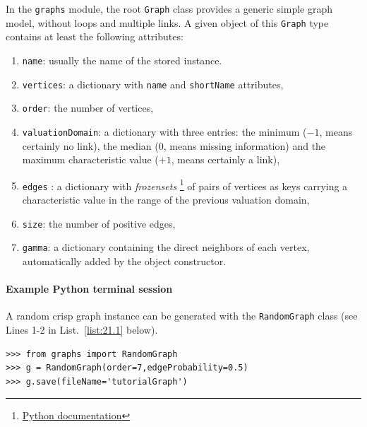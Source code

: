 In the \Digraph \texttt{graphs} module, the root \texttt{Graph} class  provides a generic simple graph model, without loops and multiple links. A given object of this \texttt{Graph} type contains at least the following attributes:
\begin{enumerate}[topsep=1pt]
\item \texttt{name}: usually the name of the stored instance.
\item \texttt{vertices}: a dictionary with \texttt{name} and \texttt{shortName} attributes,
\item \texttt{order}: the number of vertices,
\item \texttt{valuationDomain}: a dictionary with three entries: the minimum ($-1$, means certainly no link), the median ($0$, means missing information) and the maximum characteristic value ($+1$, means certainly a link),
\item \texttt{edges} : a dictionary with \emph{frozensets} \footnote{\href{https://docs.python.org/3.9/library/stdtypes.html?highlight=frozenset\#frozenset}{Python documentation}} of pairs of vertices as keys carrying a characteristic value in the range of the previous valuation domain,
\item \texttt{size}: the number of positive edges,
\item \texttt{gamma}: a dictionary containing the direct neighbors of each vertex, automatically added by the object constructor.
\end{enumerate}

\paragraph{\textbf{Example Python terminal session}}

\noindent A random crisp graph instance can be generated with the \texttt{RandomGraph} class (see Lines 1-2 in List.~\vref{list:21.1} below). 
\begin{lstlisting}[caption={Generating a randm graph instance},label=list:21.1]
>>> from graphs import RandomGraph
>>> g = RandomGraph(order=7,edgeProbability=0.5)
>>> g.save(fileName='tutorialGraph')
\end{lstlisting}

